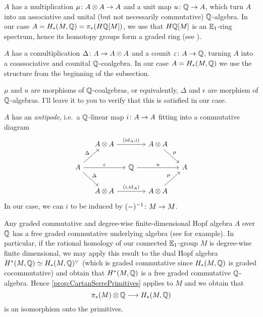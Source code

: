 \begin{alphanumerate}
	\item $A$ has a multiplication $\mu\colon A\otimes A\morphism A$ and a unit map $u\colon \IQ\morphism A$, which turn $A$ into an associative and unital (but not necessarily commutative) $\mathbb{Q}$-algebra. In our case $A=H_*(M,\mathbb{Q})=\pi_* (H\mathbb{Q}[M])$, we use that $H\mathbb{Q}[M]$ is an $\mathbb{E}_1$-ring spectrum, hence its homotopy groups form a graded ring (see ).
	\item $A$ has a comultiplication $\Delta \colon A\morphism A\otimes A$ and a counit $\epsilon\colon A\morphism\IQ$, turning $A$ into a coassociative and counital $\mathbb{Q}$-coalgebra. In our case $A=H_*(M,\mathbb{Q})$ we use the structure from the beginning of the subsection.
	\item $\mu$ and $u$ are morphisms of $\mathbb{Q}$-coalgebras, or equivalently, $\Delta$ and $\epsilon$ are morphism of $\mathbb{Q}$-algebras. I'll leave it to you to verify that this is satisfied in our case.
	\item $A$ has an \emph{antipode}, i.e.\ a $\mathbb{Q}$-linear map $i\colon A\morphism A$ fitting into a commutative diagram
	\begin{equation*}
		\begin{tikzcd}[column sep=small]
			& A \otimes A\ar[rr,"{(\id_A,i)}"] & & A\otimes A\drar["\mu"]\\
			A\drar["\Delta"]\urar["\Delta"] \ar[rr, "\epsilon"] & & \IQ\ar[rr, "u"] & & A\\
			& A\otimes A \ar[rr, "{(i,\id_A)}"] & & A\otimes A\urar["\mu"]
		\end{tikzcd}
	\end{equation*}
	In our case, we can $i$ to be induced by $(-)^{-1}\colon M\morphism M$.
\end{alphanumerate}


Any graded commutative and degree-wise finite-dimensional Hopf algebra $A$ over $\mathbb{Q}$ has a free graded commutative underlying algebra (see \cite[Theorem~3C.4]{Hatcher} for example). In particular, if the rational homology of our connected $\mathbb{E}_1$-group $M$ is degree-wise finite dimensional, we may apply this result to the dual Hopf algebra $H^*(M,\mathbb{Q})\simeq H_*(M,\mathbb{Q})^\vee$ (which is graded commutative since $H_*(M,\mathbb{Q})$ is graded cocommutative) and obtain that $H^*(M,\mathbb{Q})$ is a free graded commutative $\mathbb{Q}$-algebra. Hence \cref{prop:CartanSerrePrimitives} applies to $M$ and we obtain that
\begin{equation*}
	\pi_*(M)\otimes \IQ\morphism H_*(M,\IQ)
\end{equation*}
is an isomorphism onto the primitives.

